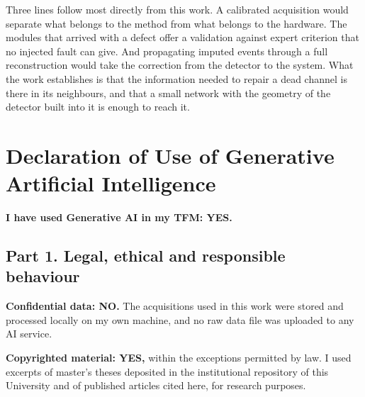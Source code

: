 \documentclass[10pt,conference]{IEEEtran}
\begin{document}
Three lines follow most directly from this work. A calibrated acquisition would
separate what belongs to the method from what belongs to the hardware. The
modules that arrived with a defect offer a validation against expert criterion
that no injected fault can give. And propagating imputed events through a full
reconstruction would take the correction from the detector to the system. What
the work establishes is that the information
needed to repair a dead channel is there in its neighbours, and that a small
network with the geometry of the detector built into it is enough to reach it.





%
\onecolumn
\section*{Declaration of Use of Generative Artificial Intelligence}

\noindent\textbf{I have used Generative AI in my TFM: YES.}

\subsection*{Part 1. Legal, ethical and responsible behaviour}

\textbf{Confidential data: NO.} The acquisitions used in this work were stored
and processed locally on my own machine, and no raw data file was uploaded to
any AI service.

\textbf{Copyrighted material: YES,} within the exceptions permitted by law. I
used excerpts of master's theses deposited in the institutional repository of
this University and of published articles cited here, for research purposes.
\end{document}
